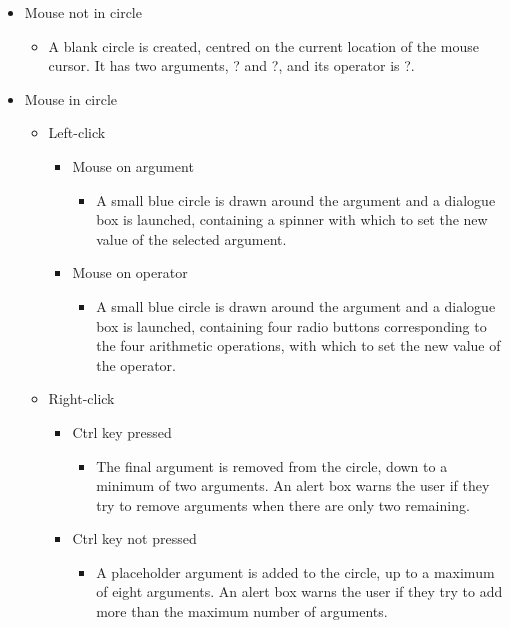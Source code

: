 \documentclass[12pt,twoside,notitlepage,xetex]{report}
\begin{document}
\begin{itemize}
\item Mouse not in circle
\begin{itemize}
\item A blank circle is created, centred on the current location of the mouse cursor.  It has two arguments, {\sfapp ?} and {\sfapp ?}, and its operator is {\sfapp ?}.
\end{itemize}
\item Mouse in circle
\begin{itemize}
\item Left-click
\begin{itemize}
\item Mouse on argument
\begin{itemize}
\item A small blue circle is drawn around the argument and a dialogue box is launched, containing a spinner with which to set the new value of the selected argument.
\end{itemize}
\item Mouse on operator
\begin{itemize}
\item A small blue circle is drawn around the argument and a dialogue box is launched, containing four radio buttons corresponding to the four arithmetic operations, with which to set the new value of the operator.
\end{itemize}
\end{itemize}
\item Right-click
\begin{itemize}
\item Ctrl key pressed
\begin{itemize}
\item The final argument is removed from the circle, down to a minimum of two arguments.  An alert box warns the user if they try to remove arguments when there are only two remaining.
\end{itemize}
\item Ctrl key not pressed
\begin{itemize}
\item A placeholder argument is added to the circle, up to a maximum of eight arguments.  An alert box warns the user if they try to add more than the maximum number of arguments.
\end{itemize}
\end{itemize}
\end{itemize}
\end{itemize}
\end{document}
